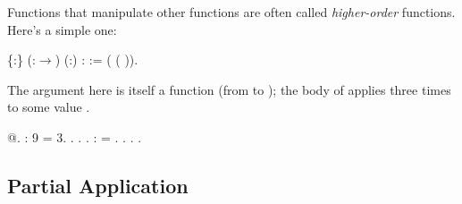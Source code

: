 \documentclass[12pt]{report}
\begin{document}
    Functions that manipulate other functions are often called
    \textit{higher-order} functions.  Here's a simple one: \begin{coqdoccode}
\coqdocemptyline
\coqdocnoindent
{}  \{:\} (:\ensuremath{\rightarrow}) (:) :  :=\coqdoceol
\coqdocindent{1.00em}
 ( ( )).\coqdoceol
\coqdocemptyline
\end{coqdoccode}
The argument  here is itself a function (from  to
    ); the body of  applies  three times to some
    value . \begin{coqdoccode}
\coqdocemptyline
\coqdocnoindent
{} @.\coqdoceol
\coqdocemptyline
\coqdocnoindent
{} :   9 = 3.\coqdoceol
\coqdocnoindent
{}. . .\coqdoceol
\coqdocemptyline
\coqdocnoindent
{} :    = .\coqdoceol
\coqdocnoindent
{}. . .\coqdoceol
\coqdocemptyline
\end{coqdoccode}
\subsection{Partial Application}
\end{document}

